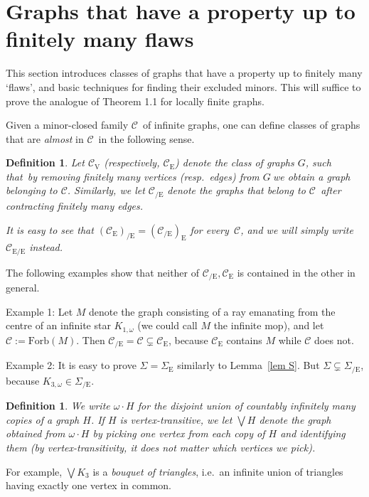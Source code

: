 \documentclass{article}
\newcommand{\forb}[1]{\mathrm{Forb}(#1)}
\newcommand{\rmv}[1]{\ensuremath{#1_{\mathrm{V}}}}
\newcommand{\rme}[1]{\ensuremath{#1_{\mathrm{E}}}}
\newcommand{\rmce}[1]{\ensuremath{#1_{\mathrm{/E}}}}
\newcommand{\rmece}[1]{\ensuremath{#1_{\mathrm{E/E}}}}
\newcommand{\Sig}{\ensuremath{\Sigma}}
\newcommand{\omdot}{\omega \cdot}
\newcommand{\defi}[1]{{\color{darkgray}\emph{#1}}}
\newtheorem{definition}[proposition]{Definition}
\newcommand{\cc}{\ensuremath{\mathcal C}}
\newcommand{\g}{\ensuremath{G\ }}
\newcommand{\G}{\ensuremath{G}}
\newcommand{\Lr}[1]{Lemma~\ref{#1}}
\newcommand{\fe}{for every}
\newcommand{\st}{such that}
\begin{document}
\section{Graphs that have a property up to finitely many flaws} \label{sec AF} 

This section introduces classes of graphs that have a property up to finitely many `flaws', and basic techniques for finding their excluded minors. This will suffice to prove the analogue of Theorem 1.1 for locally finite graphs.

Given a minor-closed family \cc\ of infinite graphs, one can define classes of graphs that are \defi{almost} in \cc\ in the following sense. 

\begin{definition} \label{def almost} Let \defi{\rmv{\cc}} (respectively, \defi{\rme{\cc}}) denote the class of graphs \G, \st\ by removing finitely many vertices (resp.\ edges) from \g we obtain a graph belonging to \cc. Similarly, we let  \defi{\rmce{\cc}} denote the graphs that belong to \cc\ after contracting finitely many edges. 

It is easy to see that $\rmce{(\rme{\cc})} = \rme{(\rmce{\cc})}$ \fe\ \cc, and we will simply write $\rmece{\cc}$ instead.
\end{definition}

The following examples show that neither of $\cc_{\mathrm{/E}},\cc_\mathrm{E}$ is contained in the other in general. 

Example 1: Let $M$ denote the graph consisting of a ray emanating from the centre of an infinite star $K_{1,\omega}$ (we could call $M$ the infinite mop), and let $\cc:= \forb{M}$. Then $\cc_{\mathrm{/E}}=\cc \subsetneq \cc_\mathrm{E}$, because $\cc_\mathrm{E}$ contains $M$ while $\cc$ does not. 

Example 2: It is easy to prove $\Sig= \Sig_\mathrm{E}$ similarly to \Lr{lem S}. But $\Sig \subsetneq \Sig_\mathrm{/E}$, because $K_{3,\omega} \in \Sig_\mathrm{/E}$.


\begin{definition} \label{def omdot}
We write \defi{$\omdot H$} for the disjoint union of countably infinitely many copies of a graph $H$. If $H$ is  vertex-transitive, we let \defi{$\bigvee H$} denote the graph obtained from $\omdot H$ by picking one vertex from each copy of $H$ and identifying them (by vertex-transitivity, it does not matter which vertices we pick).
\end{definition} 
 For example, $\bigvee K_3$ is a \defi{bouquet of triangles}, i.e.\ an infinite union of triangles having exactly one vertex in common.
\end{document}
